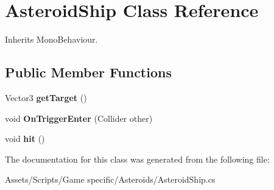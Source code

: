 \hypertarget{class_asteroid_ship}{\section{Asteroid\-Ship Class Reference}
\label{class_asteroid_ship}
}


Inherits Mono\-Behaviour.

\subsection*{Public Member Functions}
\begin{DoxyCompactItemize}
\item 
\hypertarget{class_asteroid_ship_a661459f19ac4b4bd96b56396af7c9fe9}{Vector3 {\bfseries get\-Target} ()}\label{class_asteroid_ship_a661459f19ac4b4bd96b56396af7c9fe9}

\item 
\hypertarget{class_asteroid_ship_a2cd654bdea132be5fc6d26d210f56c80}{void {\bfseries On\-Trigger\-Enter} (Collider other)}\label{class_asteroid_ship_a2cd654bdea132be5fc6d26d210f56c80}

\item 
\hypertarget{class_asteroid_ship_a4c77a4a31a6574ed3bf26c5de0da3adc}{void {\bfseries hit} ()}\label{class_asteroid_ship_a4c77a4a31a6574ed3bf26c5de0da3adc}

\end{DoxyCompactItemize}


The documentation for this class was generated from the following file\-:\begin{DoxyCompactItemize}
\item 
Assets/\-Scripts/\-Game specific/\-Asteroids/Asteroid\-Ship.\-cs\end{DoxyCompactItemize}
